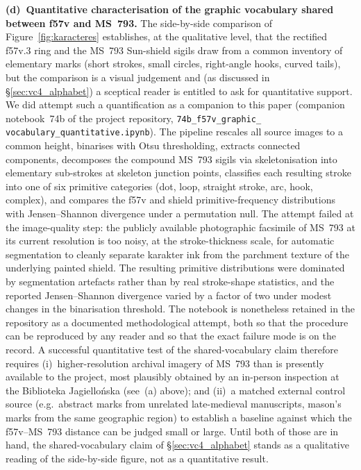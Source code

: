 \noindent\textbf{(d)~Quantitative characterisation of the graphic
vocabulary shared between f57v and MS~793.} The side-by-side comparison
of Figure~\ref{fig:karacteres} establishes, at the qualitative level,
that the rectified f57v.3 ring and the MS~793 Sun-shield sigils draw
from a common inventory of elementary marks (short strokes, small
circles, right-angle hooks, curved tails), but the comparison is a
visual judgement and (as discussed in \S\ref{sec:vc4_alphabet}) a
sceptical reader is entitled to ask for quantitative support. We did
attempt such a quantification as a companion to this paper (companion
notebook~74b of the project repository, \texttt{74b\_f57v\_graphic\_%
vocabulary\_quantitative.ipynb}). The pipeline rescales all source
images to a common height, binarises with Otsu thresholding, extracts
connected components, decomposes the compound MS~793 sigils via
skeletonisation into elementary sub-strokes at skeleton junction
points, classifies each resulting stroke into one of six primitive
categories (dot, loop, straight stroke, arc, hook, complex), and
compares the f57v and shield primitive-frequency distributions with
Jensen--Shannon divergence under a permutation null. The attempt
failed at the image-quality step: the publicly available photographic
facsimile of MS~793 at its current resolution is too noisy, at the
stroke-thickness scale, for automatic segmentation to cleanly separate
karakter ink from the parchment texture of the underlying painted
shield. The resulting primitive distributions were dominated by
segmentation artefacts rather than by real stroke-shape statistics,
and the reported Jensen--Shannon divergence varied by a factor of two
under modest changes in the binarisation threshold. The notebook is
nonetheless retained in the repository as a documented methodological
attempt, both so that the procedure can be reproduced by any reader
and so that the exact failure mode is on the record. A successful
quantitative test of the shared-vocabulary claim therefore requires
(i)~higher-resolution archival imagery of MS~793 than is presently
available to the project, most plausibly obtained by an in-person
inspection at the Biblioteka Jagiello\'nska (see~(a) above); and
(ii)~a matched external control source (e.g.\ abstract marks from
unrelated late-medieval manuscripts, mason's marks from the same
geographic region) to establish a baseline against which the
f57v--MS~793 distance can be judged small or large. Until both of
those are in hand, the shared-vocabulary claim of
\S\ref{sec:vc4_alphabet} stands as a qualitative reading of the
side-by-side figure, not as a quantitative result.

